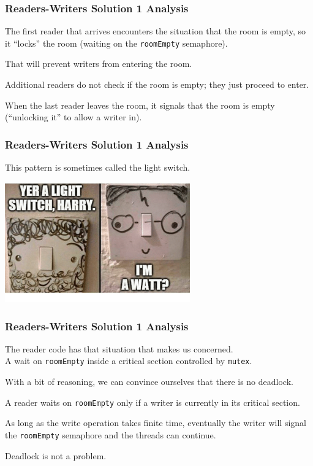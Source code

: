 \begin{frame}
	\frametitle{Readers-Writers Solution 1 Analysis}

	The first reader that arrives encounters the situation that the room is empty, so it ``locks'' the room (waiting on the \texttt{roomEmpty} semaphore).

	That will prevent writers from entering the room.

	Additional readers do not check if the room is empty; they just proceed to enter.

	When the last reader leaves the room, it signals that the room is empty (``unlocking it'' to allow a writer in).

\end{frame}

\begin{frame}
	\frametitle{Readers-Writers Solution 1 Analysis}

	This pattern is sometimes called the \alert{light switch}.

	\begin{center}
		\includegraphics[width=0.6\textwidth]{images/lightswitch.png}
	\end{center}

\end{frame}


\begin{frame}
	\frametitle{Readers-Writers Solution 1 Analysis}

	The reader code has that situation that makes us concerned.\\
	\quad A wait on \texttt{roomEmpty} inside a critical section controlled by \texttt{mutex}.

	With a bit of reasoning, we can convince ourselves that there is no deadlock.

	A reader waits on \texttt{roomEmpty} only if a writer is currently in its critical section.

	As long as the write operation takes finite time, eventually the writer will signal the \texttt{roomEmpty} semaphore and the threads can continue.

	Deadlock is not a problem.

\end{frame}


